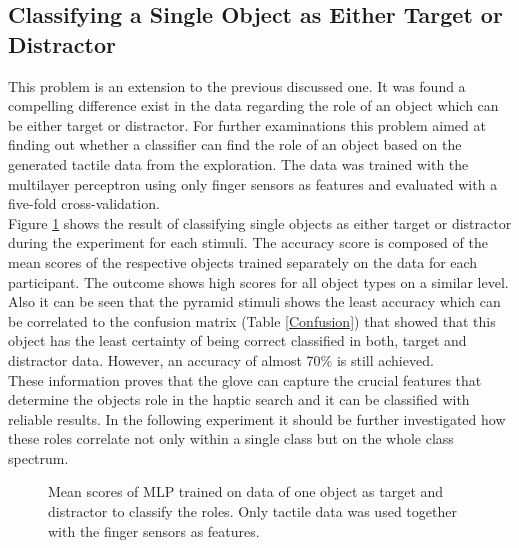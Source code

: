 \subsection{Classifying a Single Object as Either Target or Distractor}
This problem is an extension to the previous discussed one. It was found a compelling difference exist in the data regarding the role of an object which can be either target or distractor. For further examinations this problem aimed at finding out whether a classifier can find the role of an object based on the generated tactile data from the exploration. The data was trained with the multilayer perceptron using only finger sensors as features and evaluated with a five-fold cross-validation. \\
Figure \ref{tnt} shows the result of classifying single objects as either target or distractor during the experiment for each stimuli. The accuracy score is composed of the mean scores of the respective objects trained separately on the data for each participant. The outcome shows high scores for all object types on a similar level. Also it can be seen that the pyramid stimuli shows the least accuracy which can be correlated to the confusion matrix (Table \ref{Confusion}) that showed that this object has the least certainty of being correct classified in both, target and distractor data. However, an accuracy of almost 70\% is still achieved. \\
These information proves that the glove can capture the crucial features that determine the objects role in the haptic search and it can be classified with reliable results. In the following experiment it should be further investigated how these roles correlate not only within a single class but on the whole class spectrum.  
 

\begin{figure}[H]
	\caption{Mean scores of MLP trained on data of one object as target and distractor to classify the roles. Only tactile data was used together with the finger sensors as features.}
	\label{tnt}
\end{figure}

